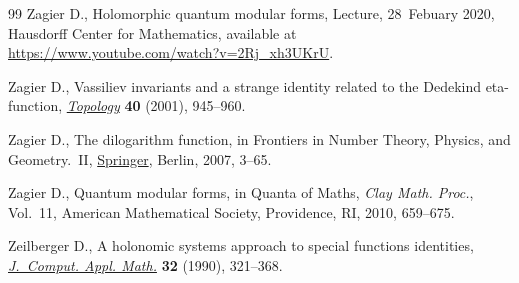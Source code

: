 \documentclass[pdftex]{sigma}
\numberwithin{equation}{section}
\begin{document}
\begin{thebibliography}{99}
Zagier D., Holomorphic quantum modular forms, {L}ecture, 28~{F}ebuary 2020,
  {H}ausdorff Center for Mathematics, available at
  \url{https://www.youtube.com/watch?v=2Rj_xh3UKrU}.

Zagier D., Vassiliev invariants and a strange identity related to the
  {D}edekind eta-function, \href{https://doi.org/10.1016/S0040-9383(00)00005-7}{\textit{Topology}} \textbf{40} (2001), 945--960.

Zagier D., The dilogarithm function, in Frontiers in Number Theory, Physics,
  and Geometry.~{II}, \href{https://doi.org/10.1007/978-3-540-30308-4_1}{Springer}, Berlin, 2007, 3--65.

Zagier D., Quantum modular forms, in Quanta of Maths, \textit{Clay Math.
  Proc.}, Vol.~11, American Mathematical Society, Providence, RI, 2010,
  659--675.

Zeilberger D., A holonomic systems approach to special functions identities,
  \href{https://doi.org/10.1016/0377-0427(90)90042-X}{\textit{J.~Comput. Appl. Math.}} \textbf{32} (1990), 321--368.

\end{thebibliography}\LastPageEnding
\end{document}

